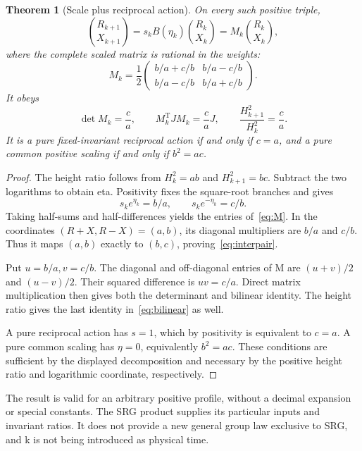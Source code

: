 \documentclass[11pt,a4paper]{article}
\newtheorem{theorem}{Theorem}[section]
\newcommand{\tr}{\mathrm T}
\begin{document}
\begin{theorem}[Scale plus reciprocal action]
On every such positive triple,
\begin{equation}
\binom{R_{k+1}}{X_{k+1}}
=s_k B(\eta_k)\binom{R_k}{X_k}
=M_k\binom{R_k}{X_k},
\label{eq:interpair}
\end{equation}
where the complete scaled matrix is rational in the weights:
\begin{equation}
M_k=\frac12\begin{pmatrix}b/a+c/b&b/a-c/b\\b/a-c/b&b/a+c/b\end{pmatrix}.
\label{eq:M}
\end{equation}
It obeys
\begin{equation}
\det M_k=\frac ca,\qquad M_k^{\tr}JM_k=\frac ca J,
\qquad \frac{H_{k+1}^2}{H_k^2}=\frac ca.
\label{eq:bilinear}
\end{equation}
It is a pure fixed-invariant reciprocal action if and only if $c=a$, and a pure common positive scaling if and only if $b^2=ac$.
\end{theorem}
\begin{proof}
The height ratio follows from $H_k^2=ab$ and $H_{k+1}^2=bc$. Subtract the two logarithms to obtain eta. Positivity fixes the square-root branches and gives
\[
s_ke^{\eta_k}=b/a,\qquad s_ke^{-\eta_k}=c/b.
\]
Taking half-sums and half-differences yields the entries of~\eqref{eq:M}. In the coordinates $(R+X,R-X)=(a,b)$, its diagonal multipliers are $b/a$ and $c/b$. Thus it maps $(a,b)$ exactly to $(b,c)$, proving~\eqref{eq:interpair}.

Put $u=b/a,v=c/b$. The diagonal and off-diagonal entries of M are $(u+v)/2$ and $(u-v)/2$. Their squared difference is $uv=c/a$. Direct matrix multiplication then gives both the determinant and bilinear identity. The height ratio gives the last identity in~\eqref{eq:bilinear} as well.

A pure reciprocal action has $s=1$, which by positivity is equivalent to $c=a$. A pure common scaling has $\eta=0$, equivalently $b^2=ac$. These conditions are sufficient by the displayed decomposition and necessary by the positive height ratio and logarithmic coordinate, respectively.
\end{proof}
The result is valid for an arbitrary positive profile, without a decimal expansion or special constants. The SRG product supplies its particular inputs and invariant ratios. It does not provide a new general group law exclusive to SRG, and k is not being introduced as physical time.
\end{document}
